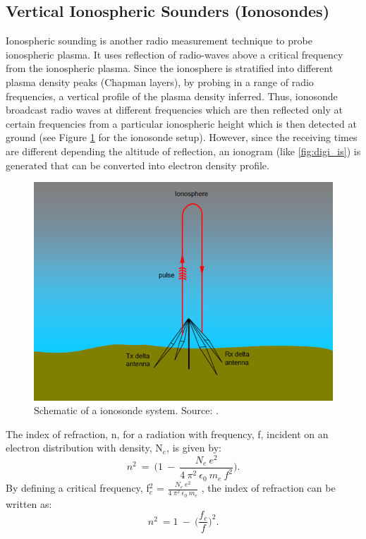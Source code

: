 \documentclass[crop=false,class=mitthesis,oneside,font=12pt]{standalone}
\begin{document}
\subsection{Vertical Ionospheric Sounders (Ionosondes)}
Ionospheric sounding is another radio measurement technique to probe ionospheric plasma. It uses reflection of radio-waves above a critical frequency from the ionospheric plasma. Since the ionosphere is stratified into different plasma density peaks (Chapman layers), by probing in a range of radio frequencies, a vertical profile of the plasma density inferred. Thus, ionosonde broadcast radio waves at different frequencies which are then reflected only at certain frequencies from a particular ionospheric height which is then detected at ground (see Figure \ref{fig:digi_im} for the ionosonde setup). However, since the receiving times are different depending the altitude of reflection, an ionogram (like \ref{fig:digi_is}) is generated that can be converted into electron density profile.
\begin{figure}[H]
	\centering\includegraphics[width=30pc]{ionosonde.png}
	\caption{Schematic of a ionosonde system. Source: \cite{heather}.}
	\label{fig:digi_im}
\end{figure}

The index of refraction, n, for a radiation with frequency, f, incident on an electron distribution with density, N$_e$,  is given by:
\begin{equation*}
n^2~=~\Big(1~-~\frac{N_{e}~e^{2}}{4~\pi^{2}~\epsilon_{0}~m_{e}~f^{2}}\Big).
\end{equation*}
By defining a critical frequency, f$_c^2$ = $\frac{N_e~e^2}{4~\pi^{2}~\epsilon_{0}~m_{e}}$ , the index of refraction can be written as:
\begin{equation}
n^2~=1~-~\Bigg(\frac{f_c}{f}\Bigg)^2.
\end{equation}
\end{document}
